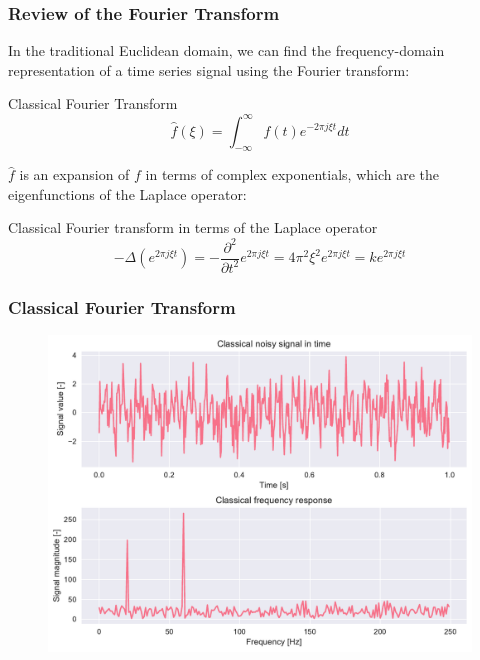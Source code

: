 \documentclass{beamer}
\begin{document}
\begin{frame}
\frametitle{Review of the Fourier Transform}

In the traditional Euclidean domain, we can find the frequency-domain
representation of a time series signal using the Fourier transform:

\begin{block}{Classical Fourier Transform}
  \begin{equation}
    \hat{f}(\xi) = \int_{-\infty}^{\infty} f(t) e^{-2 \pi j \xi t} dt 
  \end{equation}
\end{block}

$\hat{f}$ is an expansion of $f$ in terms of complex exponentials, which are the
eigenfunctions of the Laplace operator:

\begin{block}{Classical Fourier transform in terms of the Laplace operator}
  \begin{equation}
    - \Delta (e^{2 \pi j \xi t}) = - \frac{\partial^2}{\partial t^2} e^{2 \pi j \xi t} = 4 \pi^2 \xi^2 e^{2 \pi j \xi t} = k e^{2 \pi j \xi t}
  \end{equation}
\end{block}
\end{frame}

\begin{frame}  
  \frametitle{Classical Fourier Transform}
\begin{figure}
\includegraphics[width=0.7\linewidth]{../img/graph_fourier_transform_0.pdf}
\end{figure}
\end{frame}
\end{document}

